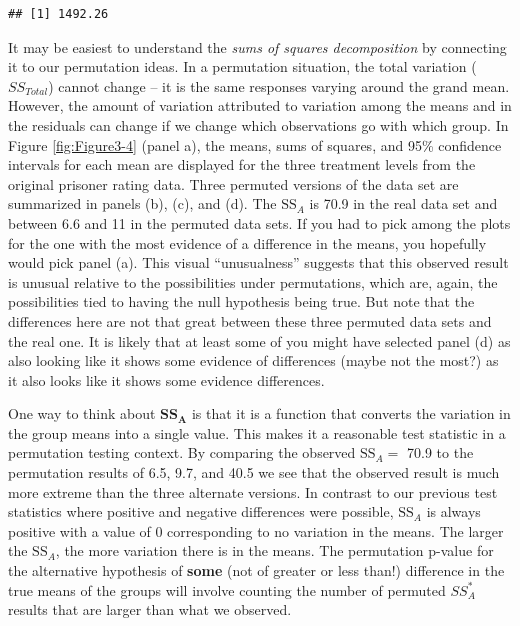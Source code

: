 \documentclass[]{book}
\begin{document}
\begin{verbatim}
## [1] 1492.26
\end{verbatim}

It may be easiest to understand the \emph{sums of squares decomposition}
by connecting it to our permutation ideas. In a permutation situation,
the total variation (\(SS_{Total}\)) cannot change -- it is the same
responses varying around the grand mean. However, the amount of
variation attributed to variation among the means and in the residuals
can change if we change which observations go with which group. In
Figure \ref{fig:Figure3-4} (panel a), the means, sums of squares, and
95\% confidence intervals for each mean are displayed for the three
treatment levels from the original prisoner rating data. Three permuted
versions of the data set are summarized in panels (b), (c), and (d). The
\(\text{SS}_A\) is 70.9 in the real data set and between 6.6 and 11 in
the permuted data sets. If you had to pick among the plots for the one
with the most evidence of a difference in the means, you hopefully would
pick panel (a). This visual ``unusualness'' suggests that this observed
result is unusual relative to the possibilities under permutations,
which are, again, the possibilities tied to having the null hypothesis
being true. But note that the differences here are not that great
between these three permuted data sets and the real one. It is likely
that at least some of you might have selected panel (d) as also looking
like it shows some evidence of differences (maybe not the most?) as it
also looks like it shows some evidence differences.

One way to think about \(\textbf{SS}_\textbf{A}\) is that it is a
function that converts the variation in the group means into a single
value. This makes it a reasonable test statistic in a permutation
testing context. By comparing the observed \(\text{SS}_A =\) 70.9 to the
permutation results of 6.5, 9.7, and 40.5 we see that the observed
result is much more extreme than the three alternate versions. In
contrast to our previous test statistics where positive and negative
differences were possible, \(\text{SS}_A\) is always positive with a
value of 0 corresponding to no variation in the means. The larger the
\(\text{SS}_A\), the more variation there is in the means. The
permutation p-value for the alternative hypothesis of \textbf{some} (not
of greater or less than!) difference in the true means of the groups
will involve counting the number of permuted \(SS_A^*\) results that are
larger than what we observed.
\end{document}
